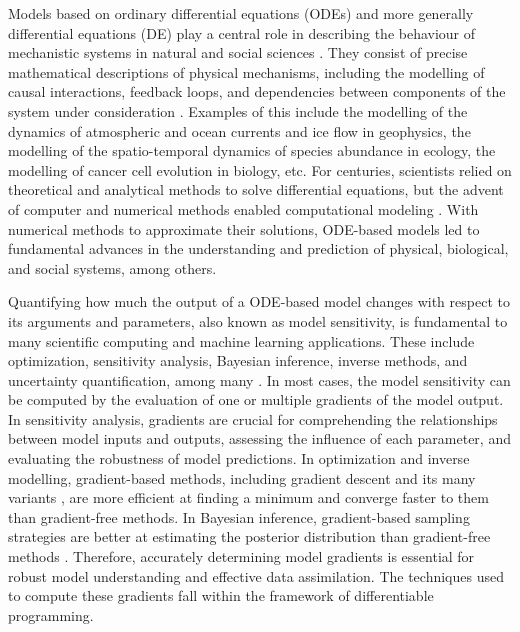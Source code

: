 Models based on ordinary differential equations (ODEs) and more generally differential equations (DE) play a central role in describing the behaviour of mechanistic systems in natural and social sciences \cite{Ghattas.2021}.
They consist of precise mathematical descriptions of physical mechanisms, including the modelling of causal interactions, feedback loops, and dependencies between components of the system under consideration \cite{rackauckas2020universal}.
Examples of this include the modelling of the dynamics of atmospheric and ocean currents and ice flow in geophysics, the modelling of the spatio-temporal dynamics of species abundance in ecology, the modelling of cancer cell evolution in biology, etc.  
For centuries, scientists relied on theoretical and analytical methods to solve differential equations, but the advent of computer and numerical methods enabled computational modeling \cite{Dahlquist_1985, hey2009}.
With numerical methods to approximate their solutions, ODE-based models led to fundamental advances in the understanding and prediction of physical, biological, and social systems, among others.


Quantifying how much the output of a ODE-based model changes with respect to its arguments and parameters, also known as model sensitivity, is fundamental to many scientific computing and machine learning applications. 
These include optimization, sensitivity analysis, Bayesian inference, inverse methods, and uncertainty quantification, among many \cite{Razavi.2021}. 
In most cases, the model sensitivity can be computed by the evaluation of one or multiple gradients of the model output. 
In sensitivity analysis, gradients are crucial for comprehending the relationships between model inputs and outputs, assessing the influence of each parameter, and evaluating the robustness of model predictions. 
In optimization and inverse modelling, gradient-based methods, including gradient descent and its many variants \cite{ruder2016overview-gradient-descent}, are more efficient at finding a minimum and converge faster to them than gradient-free methods.
In Bayesian inference, gradient-based sampling strategies are better at estimating the posterior distribution than gradient-free methods \cite{neal2011mcmc}.
Therefore, accurately determining model gradients is essential for robust model understanding and effective data assimilation. 
The techniques used to compute these gradients fall within the framework of differentiable programming.

